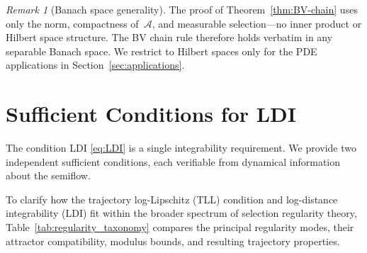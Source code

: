 \documentclass[12pt,a4paper]{article}
\theoremstyle{definition}
\theoremstyle{plain}
\theoremstyle{remark}
\newtheorem{remark}[definition]{Remark}
\begin{document}
\begin{remark}[Banach space generality]
\label{rem:banach}
The proof of Theorem~\ref{thm:BV-chain} uses only the norm,
compactness of~$\mathcal{A}$, and measurable selection---no
inner product or Hilbert space structure.  The BV chain rule
therefore holds verbatim in any separable Banach space.  We
restrict to Hilbert spaces only for the PDE applications in
Section~\ref{sec:applications}.
\end{remark}


\section{Sufficient Conditions for LDI}
\label{sec:sufficient}

The condition LDI \eqref{eq:LDI} is a single integrability
requirement.  We provide two independent sufficient conditions,
each verifiable from dynamical information about the semiflow.

To clarify how the trajectory log-Lipschitz (TLL) condition and log-distance integrability (LDI) fit within the broader spectrum of selection regularity theory, Table~\ref{tab:regularity_taxonomy} compares the principal regularity modes, their attractor compatibility, modulus bounds, and resulting trajectory properties.
\end{document}
